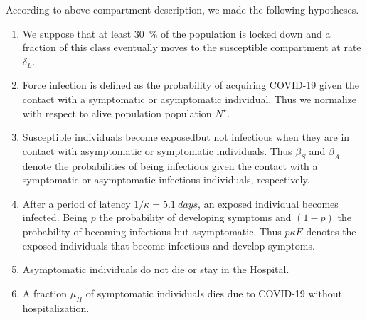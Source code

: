 \begin{assumptions}
    According to above compartment description, we made the following
    hypotheses.
    \begin{enumerate}[({A}-1)]
        \item
            We suppose that at least \SI{30}{\percent} of the population is
            locked down and a fraction of this class eventually moves
            to the susceptible compartment at rate $\delta_L$.
        \item
            Force infection is defined as the probability of acquiring COVID-19
            given the contact with a symptomatic or asymptomatic individual.
            Thus we normalize with respect to alive population population
            $
                N^{\star}
            $.
        \item
            Susceptible individuals become
            exposed\textemdash but not infectious\textemdash
            when they are in contact with asymptomatic or symptomatic
            individuals. Thus $\beta_S$ and $\beta_A$ denote the
            probabilities of being infectious given the contact with a symptomatic or
            asymptomatic infectious individuals, respectively.
        \item
            After a period of latency  $1/\kappa = \SI{5.1}{days}$, an
            exposed individual becomes infected. Being $p$ the probability of
            developing symptoms and $(1-p)$ the probability of becoming infectious
            but asymptomatic. Thus $p\kappa E$ denotes the
            exposed individuals that become infectious and develop symptoms.
        \item
            Asymptomatic individuals do not die or stay in the Hospital.
        \item
            A fraction $\mu_{H}$ of symptomatic individuals
            dies due to COVID-19 without hospitalization.
    \end{enumerate}
\end{assumptions}

